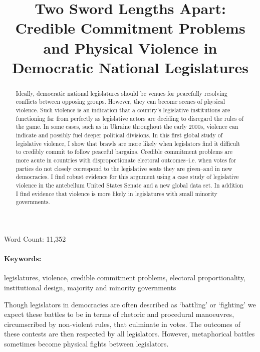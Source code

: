 \documentclass[a4paper]{article}\usepackage[]{graphicx}\usepackage[]{color}
\title{Two Sword Lengths Apart: Credible Commitment Problems and Physical Violence in Democratic National Legislatures}
\begin{document}
\maketitle

\begin{center}
Word Count: 11,352
\end{center}

\begin{abstract}
Ideally, democratic national legislatures should be venues for peacefully resolving conflicts between opposing groups. However, they can become scenes of physical violence. Such violence is an indication that a country's legislative institutions are functioning far from perfectly as legislative actors are deciding to disregard the rules of the game. In some cases, such as in Ukraine throughout the early 2000s, violence can indicate and possibly fuel deeper political divisions. In this first global study of legislative violence, I show that brawls are more likely when legislators find it difficult to credibly commit to follow peaceful bargains. Credible commitment problems are more acute in countries with disproportionate electoral outcomes--i.e. when votes for parties do not closely correspond to the legislative seats they are given--and in new democracies. I find robust evidence for this argument using a case study of legislative violence in the antebellum United States Senate and a new global data set. In addition I find evidence that violence is more likely in legislatures with small minority governments.
\end{abstract}


\paragraph{Keywords:} legislatures, violence, credible commitment problems, electoral proportionality, institutional design, majority and minority governments

\vspace{0.3cm}


Though legislators in democracies are often described as `battling' or `fighting' we expect these battles to be in terms of rhetoric and procedural manoeuvres, circumscribed by non-violent rules, that culminate in votes. The outcomes of these contests are then respected by all legislators. However, metaphorical battles sometimes become physical fights between legislators.
\end{document}
